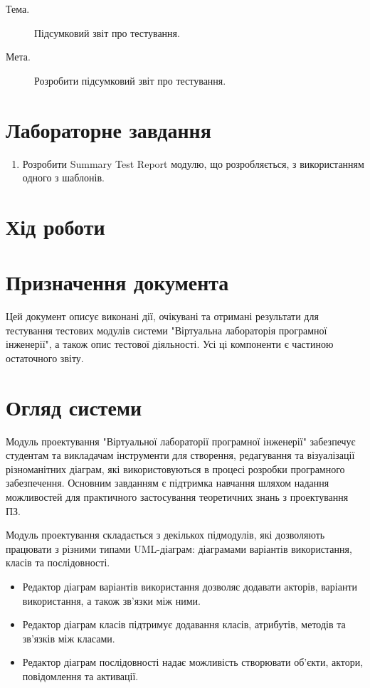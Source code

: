 \documentclass[oneside,14pt]{extarticle}
\newcommand\theme{Підсумковий звіт про тестування}
\newcommand\purpose{Розробити підсумковий звіт про тестування}
\begin{document}
\begin{normalsize}
	\begin{description}
		\item[Тема.] \theme.
		\item[Мета.] \purpose.
	\end{description}

    \section*{Лабораторне завдання}
    \begin{enumerate}
    	\item Розробити Summary Test Report модулю, що розробляється, з використанням одного з шаблонів.
    \end{enumerate}
	\section*{Хід роботи}
	\tableofcontents
	\clearpage
	\section{Призначення документа}
	Цей документ описує виконані дії, очікувані та отримані	результати для тестування тестових модулів системи "Віртуальна лабораторія програмної інженерії", а також опис тестової діяльності. Усі ці компоненти є частиною остаточного звіту.
	
	\section{Огляд системи}
	Модуль проектування "Віртуальної лабораторії програмної інженерії" забезпечує студентам та викладачам інструменти для створення, редагування та візуалізації різноманітних діаграм, які використовуються в процесі розробки програмного забезпечення. Основним завданням є підтримка навчання шляхом надання можливостей для практичного застосування теоретичних знань з проектування ПЗ.
	
	Модуль проектування складається з декількох підмодулів, які дозволяють працювати з різними типами UML-діаграм: діаграмами варіантів використання, класів та послідовності.
	
	\begin{itemize}
		\item Редактор діаграм варіантів використання дозволяє додавати акторів, варіанти використання, а також зв'язки між ними.
		\item Редактор діаграм класів підтримує додавання класів, атрибутів, методів та зв’язків між класами.
		\item Редактор діаграм послідовності надає можливість створювати об'єкти, актори, повідомлення та активації.
	\end{itemize}
	

\end{normalsize}
\end{document}
